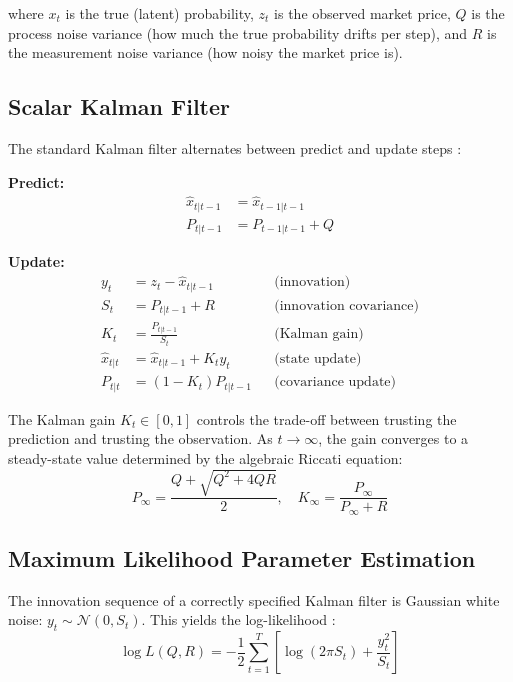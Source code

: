 \documentclass[11pt, a4paper]{article}
\begin{document}
where $x_t$ is the true (latent) probability, $z_t$ is the observed market price, $Q$ is the process noise variance (how much the true probability drifts per step), and $R$ is the measurement noise variance (how noisy the market price is).

\subsection{Scalar Kalman Filter}

The standard Kalman filter alternates between predict and update steps \citep{kalman1960}:

\textbf{Predict:}
\begin{align}
    \hat{x}_{t|t-1} &= \hat{x}_{t-1|t-1} \label{eq:predict_x} \\
    P_{t|t-1} &= P_{t-1|t-1} + Q \label{eq:predict_P}
\end{align}

\textbf{Update:}
\begin{align}
    y_t &= z_t - \hat{x}_{t|t-1} && \text{(innovation)} \label{eq:innov} \\
    S_t &= P_{t|t-1} + R && \text{(innovation covariance)} \label{eq:S} \\
    K_t &= \frac{P_{t|t-1}}{S_t} && \text{(Kalman gain)} \label{eq:gain} \\
    \hat{x}_{t|t} &= \hat{x}_{t|t-1} + K_t y_t && \text{(state update)} \label{eq:update_x} \\
    P_{t|t} &= (1 - K_t) P_{t|t-1} && \text{(covariance update)} \label{eq:update_P}
\end{align}

The Kalman gain $K_t \in [0,1]$ controls the trade-off between trusting the prediction and trusting the observation. As $t \to \infty$, the gain converges to a steady-state value determined by the algebraic Riccati equation:
\begin{equation}
    P_\infty = \frac{Q + \sqrt{Q^2 + 4QR}}{2}, \quad K_\infty = \frac{P_\infty}{P_\infty + R}
    \label{eq:riccati}
\end{equation}

\subsection{Maximum Likelihood Parameter Estimation}

The innovation sequence of a correctly specified Kalman filter is Gaussian white noise: $y_t \sim \mathcal{N}(0, S_t)$. This yields the log-likelihood \citep{schweppe1965}:
\begin{equation}
    \log L(Q, R) = -\frac{1}{2} \sum_{t=1}^{T} \left[ \log(2\pi S_t) + \frac{y_t^2}{S_t} \right]
    \label{eq:mle}
\end{equation}
\end{document}
